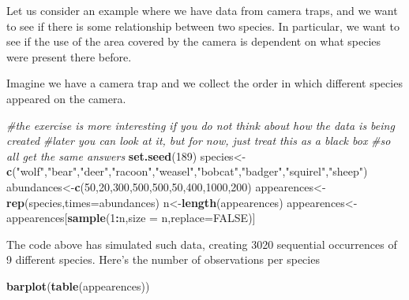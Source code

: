 \documentclass[
]{article}
\newenvironment{Shaded}{\begin{snugshade}}{\end{snugshade}}
\newcommand{\AttributeTok}[1]{\textcolor[rgb]{0.13,0.29,0.53}{#1}}
\newcommand{\CommentTok}[1]{\textcolor[rgb]{0.56,0.35,0.01}{\textit{#1}}}
\newcommand{\ConstantTok}[1]{\textcolor[rgb]{0.56,0.35,0.01}{#1}}
\newcommand{\DecValTok}[1]{\textcolor[rgb]{0.00,0.00,0.81}{#1}}
\newcommand{\FunctionTok}[1]{\textcolor[rgb]{0.13,0.29,0.53}{\textbf{#1}}}
\newcommand{\NormalTok}[1]{#1}
\newcommand{\OtherTok}[1]{\textcolor[rgb]{0.56,0.35,0.01}{#1}}
\newcommand{\SpecialCharTok}[1]{\textcolor[rgb]{0.81,0.36,0.00}{\textbf{#1}}}
\newcommand{\StringTok}[1]{\textcolor[rgb]{0.31,0.60,0.02}{#1}}
\begin{document}
Let us consider an example where we have data from camera traps, and we
want to see if there is some relationship between two species. In
particular, we want to see if the use of the area covered by the camera
is dependent on what species were present there before.

Imagine we have a camera trap and we collect the order in which
different species appeared on the camera.

\begin{Shaded}
\begin{Highlighting}[]
\CommentTok{\#the exercise is more interesting if you do not think about how the data is being created}
\CommentTok{\#later you can look at it, but for now, just treat this as a black box}
\CommentTok{\#so all get the same answers}
\FunctionTok{set.seed}\NormalTok{(}\DecValTok{189}\NormalTok{)}
\NormalTok{species}\OtherTok{\textless{}{-}}\FunctionTok{c}\NormalTok{(}\StringTok{"wolf"}\NormalTok{,}\StringTok{"bear"}\NormalTok{,}\StringTok{"deer"}\NormalTok{,}\StringTok{"racoon"}\NormalTok{,}\StringTok{"weasel"}\NormalTok{,}\StringTok{"bobcat"}\NormalTok{,}\StringTok{"badger"}\NormalTok{,}\StringTok{"squirel"}\NormalTok{,}\StringTok{"sheep"}\NormalTok{)}
\NormalTok{abundances}\OtherTok{\textless{}{-}}\FunctionTok{c}\NormalTok{(}\DecValTok{50}\NormalTok{,}\DecValTok{20}\NormalTok{,}\DecValTok{300}\NormalTok{,}\DecValTok{500}\NormalTok{,}\DecValTok{500}\NormalTok{,}\DecValTok{50}\NormalTok{,}\DecValTok{400}\NormalTok{,}\DecValTok{1000}\NormalTok{,}\DecValTok{200}\NormalTok{)}
\NormalTok{appearences}\OtherTok{\textless{}{-}}\FunctionTok{rep}\NormalTok{(species,}\AttributeTok{times=}\NormalTok{abundances)}
\NormalTok{n}\OtherTok{\textless{}{-}}\FunctionTok{length}\NormalTok{(appearences)}
\NormalTok{appearences}\OtherTok{\textless{}{-}}\NormalTok{appearences[}\FunctionTok{sample}\NormalTok{(}\DecValTok{1}\SpecialCharTok{:}\NormalTok{n,}\AttributeTok{size =}\NormalTok{ n,}\AttributeTok{replace=}\ConstantTok{FALSE}\NormalTok{)]}
\end{Highlighting}
\end{Shaded}

The code above has simulated such data, creating 3020 sequential
occurrences of 9 different species. Here's the number of observations
per species

\begin{Shaded}
\begin{Highlighting}[]
\FunctionTok{barplot}\NormalTok{(}\FunctionTok{table}\NormalTok{(appearences))}
\end{Highlighting}
\end{Shaded}
\end{document}
